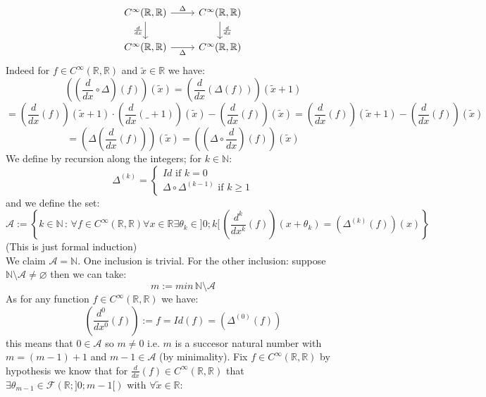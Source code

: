 \begin{solution}
\[\begin{tikzcd}
            {C^{\infty}(\mathbb{R},\mathbb{R})} & {C^{\infty}(\mathbb{R},\mathbb{R})} \\
            {C^{\infty}(\mathbb{R},\mathbb{R})} & {C^{\infty}(\mathbb{R},\mathbb{R})}
            \arrow["\Delta", from=1-1, to=1-2]
            \arrow["{\frac{d}{dx}}"', from=1-1, to=2-1]
            \arrow["{\frac{d}{dx}}", from=1-2, to=2-2]
            \arrow["\Delta"', from=2-1, to=2-2]
        \end{tikzcd}\]
    Indeed for \( f\in C^{\infty}\left(\mathbb{R},\mathbb{R}\right) \) and \( \tilde{x}\in\mathbb{R} \) we have:
    \[
        \left(\left(\frac{d}{dx}\circ\Delta\right) \left(f\right)\right)\left(\tilde{x}\right)=\left(\frac{d}{dx}\left(\Delta\left(f\right)\right)\right)\left(\tilde{x}+1\right)
    \]
    \[
        =\left(\frac{d}{dx}\left(f\right)\right)\left(\tilde{x}+1\right)\cdot \left(\frac{d}{dx}\left(\_+1\right)\right)\left(\tilde{x}\right)-\left(\frac{d}{dx}\left(f\right)\right)\left(\tilde{x}\right)=\left(\frac{d}{dx}\left(f\right)\right)\left(\tilde{x}+1\right)-\left(\frac{d}{dx}\left(f\right)\right)\left(\tilde{x}\right)
    \]
    \[
        =\left(\Delta\left(\frac{d}{dx}\left(f\right)\right)\right)\left(\tilde{x}\right)=\left(\left(\Delta\circ\frac{d}{dx}\right)\left(f\right)\right)\left(\tilde{x}\right)
    \]
    We define by recursion along the integers; for \( k\in\mathbb{N} \):
    \[
        \Delta^{\left(k\right)}=\begin{cases}
            Id\text{ if } k = 0\\
            \Delta\circ \Delta^{\left(k-1\right)}\text{ if } k\geq 1
        \end{cases}
    \]
    and we define the set:
    \[
    \mathcal{A}:=\left\{k\in\mathbb{N}\,:\, \forall f\in C^{\infty}\left(\mathbb{R},\mathbb{R}\right)\forall x\in\mathbb{R}\exists\theta_{k}\in]0;k[\, \left(\frac{d^k}{dx^k}\left(f\right)\right)\left(x+\theta_{k}\right)=\left(\Delta^{\left(k\right)}\left(f\right)\right)\left(x\right)\right\}
    \]
    (This is just formal induction) \\We claim \( \mathcal{A}=\mathbb{N} \). One inclusion is trivial. For the other inclusion: suppose \( \mathbb{N}\setminus\mathcal{A}\neq\varnothing \) then we can take:
    \[
        m:=min\, \mathbb{N}\setminus\mathcal{A}
    \]
    As for any function \( f\in C^{\infty}\left(\mathbb{R},\mathbb{R}\right) \) we have:
    \[
        \left(\frac{d^0}{dx^0}\left(f\right)\right):=f=Id\left(f\right)=\left(\Delta^{\left(0\right)}\left(f\right)\right)
    \]
    this means that \( 0\in\mathcal{A} \) so \( m\neq 0 \) i.e. \( m \) is a succesor natural number with \( m=\left(m-1\right)+1 \) and \( m-1\in\mathcal{A} \) (by minimality). Fix \( f\in C^{\infty}\left(\mathbb{R},\mathbb{R}\right) \) by hypothesis we know that for \( \frac{d}{dx}\left(f\right)\in C^{\infty}\left(\mathbb{R},\mathbb{R}\right) \) that \( \exists \theta_{m-1}\in\mathcal{F}(\mathbb{R};]0;m-1[) \) with \( \forall \tilde{x}\in\mathbb{R} \):

\end{solution}
